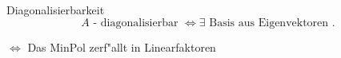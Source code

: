 \documentclass[class=article, crop=false]{standalone}
\begin{document}
\begin{zettel}{Diagonalisierbarkeit}
\[
    A \text{ - diagonalisierbar } \iff \exists \text{ Basis aus Eigenvektoren }
.\]

$\iff$  Das MinPol zerf"allt in Linearfaktoren

\end{zettel}
\end{document}

